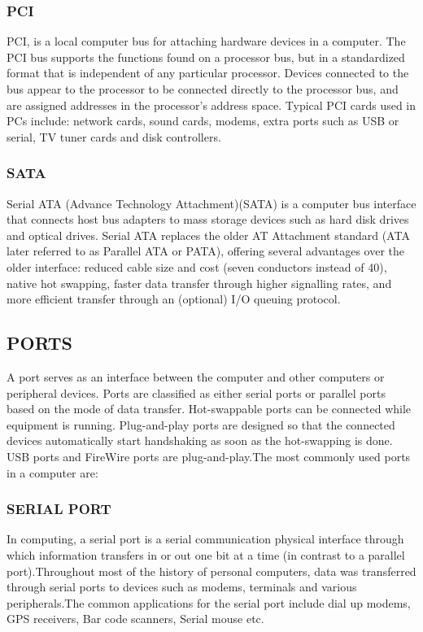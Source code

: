 \documentclass[a4paper,28pt,twoside,openright]{report}
\begin{document}
\subsubsection*{PCI}
	  PCI, is a local computer bus for attaching hardware devices in a computer. The PCI bus supports the
	  functions found on a processor bus, but in a standardized format that is independent of any particular
	  processor. Devices connected to the bus appear to the processor to be connected directly to the processor
	  bus, and are assigned addresses in the processor's address space. Typical PCI cards used in PCs include: network 			cards, sound
	  cards, modems, extra ports such as USB or serial, TV tuner cards and disk controllers.
\subsubsection*{SATA}
	   Serial ATA (Advance Technology Attachment)(SATA) is a computer bus interface that
	   connects host bus adapters to mass storage devices such as hard disk drives and optical drives. Serial ATA
	   replaces the older AT Attachment standard (ATA later referred to as Parallel ATA or PATA), offering
	   several advantages over the older interface: reduced cable size and cost (seven conductors instead of 40),
	   native hot swapping, faster data transfer through higher signalling rates, and more efficient transfer through
	   an (optional) I/O queuing protocol.
\subsection*{PORTS}
	   A port serves as an interface between the computer and other computers or peripheral devices. Ports are classified 		as either serial ports or parallel ports
	   based on the mode of data transfer. Hot-swappable ports can be connected while equipment is running. Plug-and-play 		ports are designed so that the connected
	   devices automatically start handshaking as soon as the hot-swapping is done. USB ports and FireWire ports are
	   plug-and-play.The most commonly used ports in a computer are:
\subsubsection*{SERIAL PORT}
	    In computing, a serial port is a serial communication physical interface through which
	    information transfers in or out one bit at a time (in contrast to a parallel port).Throughout most of the
	    history of personal computers, data was transferred through serial ports to devices such as modems,
	    terminals and various peripherals.The common applications for the serial port include
	    dial up modems, GPS receivers, Bar code scanners, Serial mouse etc.
\end{document}
